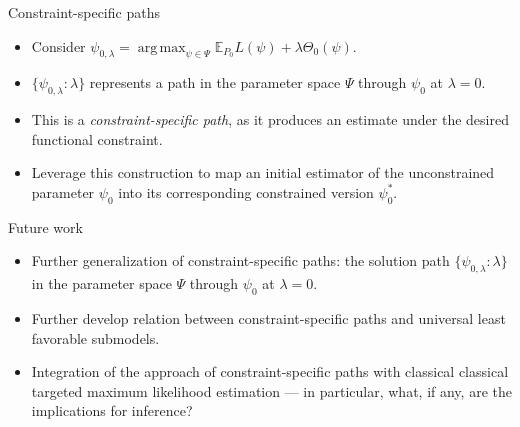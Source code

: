 \documentclass[12pt,t,handout]{beamer}
\newcommand{\E}{\mathbb{E}}
\DeclareMathOperator*{\argmax}{arg\,max}
\begin{document}

\begin{frame}[c]{Constraint-specific paths}

\begin{center}
\begin{itemize}
  \itemsep12pt
  \item Consider $\psi_{0, \lambda} = \argmax_{\psi \in \Psi} \E_{P_0}L(\psi) +
    \lambda \Theta_0(\psi)$.
  \item $\{\psi_{0, \lambda} : \lambda\}$ represents a path in the parameter
    space $\Psi$ through $\psi_0$ at $\lambda = 0$.
  \item This is a \textit{constraint-specific path}, as it produces an estimate
    under the desired functional constraint.
  \item Leverage this construction to map an initial estimator of the
    unconstrained parameter $\psi_0$ into its corresponding constrained version
    $\psi_0^*$.
\end{itemize}
\end{center}

\note{
}

\end{frame}


\begin{frame}[c]{Future work}

\begin{center}
\begin{itemize}
  \itemsep14pt
  \item Further generalization of constraint-specific paths: the solution path
    $\{\psi_{0, \lambda}: \lambda\}$ in the parameter space $\Psi$ through
    $\psi_0$ at $\lambda = 0$.
  \item Further develop relation between constraint-specific paths and universal
    least favorable submodels.
  \item Integration of the approach of constraint-specific paths with classical
    classical targeted maximum likelihood estimation --- in particular, what, if
    any, are the implications for inference?
\end{itemize}
\end{center}

\note{
}

\end{frame}
\end{document}
